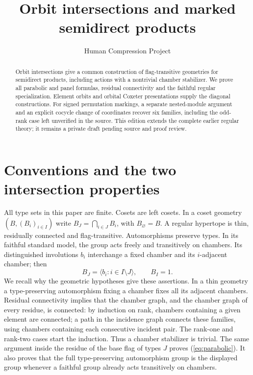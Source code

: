 
\title{Orbit intersections and marked semidirect products}
\author{Human Compression Project}\date{}
\maketitle
\begin{abstract}
Orbit intersections give a common construction of flag-transitive geometries
for semidirect products, including actions with a nontrivial chamber
stabilizer. We prove all parabolic and panel formulas, residual connectivity
and the faithful regular specialization. Element orbits and orbital Coxeter
presentations supply the diagonal constructions. For signed permutation
markings, a separate nested-module argument and an explicit cocycle change
of coordinates recover six families, including the odd-rank case left
unverified in the source. This edition extends the complete earlier regular
theory; it remains a private draft pending source and proof review.
\end{abstract}
\section{Conventions and the two intersection properties}
All type sets in this paper are finite. Cosets are left cosets. In a coset geometry $(B,(B_i)_{i\in I})$ write $B_J=\bigcap_{i\in J}B_i$, with $B_\varnothing=B$. A regular hypertope is thin, residually connected and flag-transitive. Automorphisms preserve types. In its faithful standard model, the group acts freely and transitively on chambers. Its distinguished involutions $b_i$ interchange a fixed chamber and its $i$-adjacent chamber; then
\begin{equation}\label{eq:parabolic}
B_J=\langle b_i:i\in I\setminus J\rangle,\qquad B_I=1.
\end{equation}
We recall why the geometric hypotheses give these assertions. In a thin geometry a type-preserving automorphism fixing a chamber fixes all its adjacent chambers. Residual connectivity implies that the chamber graph, and the chamber graph of every residue, is connected: by induction on rank, chambers containing a given element are connected; a path in the incidence graph connects these families, using chambers containing each consecutive incident pair. The rank-one and rank-two cases start the induction. Thus a chamber stabilizer is trivial. The same argument inside the residue of the base flag of types $J$ proves (\ref{eq:parabolic}). It also proves that the full type-preserving automorphism group is the displayed group whenever a faithful group already acts transitively on chambers.

